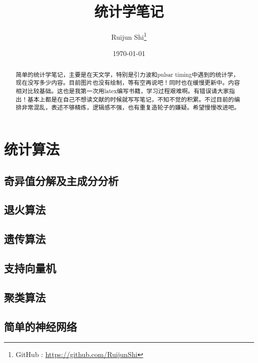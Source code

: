 \documentclass[fontset=windows]{report}
\title{\heiti\zihao{1} 统计学笔记}
\author{\songti\zihao{3} Ruijun Shi\thanks{GitHub : \href{https://github.com/RuijunShi}{https://github.com/RuijunShi}}}
\date{\songti\zihao{3} \today}
\begin{document}
	\maketitle
	\thispagestyle{empty}
\begin{abstract}
	简单的统计学笔记，主要是在天文学，特别是引力波和pulsar timing中遇到的统计学，现在没写多少内容。目前图片也没有绘制，等有空再说吧！同时也在缓慢更新中。内容相对比较基础。这也是我第一次用latex编写书籍，学习过程艰难啊。有错误请大家指出！基本上都是在自己不想读文献的时候就写写笔记，不知不觉的积累。不过目前的编排非常混乱，表述不够精炼，逻辑感不强，也有重复造轮子的嫌疑。希望慢慢改进吧。
\end{abstract}

\tableofcontents %
\newtheorem{definition}{\textbf{\setlength{\parindent}{2em} \heiti 定义}}[chapter]
\newtheorem{prop}{\textbf{\setlength{\parindent}{2em} \heiti 性质}}[chapter]
\newtheorem{theorem}{\textbf{\setlength{\parindent}{2em} \heiti 定理}}[chapter]







\chapter{统计算法}
	\section{奇异值分解及主成分分析}
	\section{退火算法}
	\section{遗传算法}
	\section{支持向量机}
	\section{聚类算法}
	\section{简单的神经网络}

\end{document}
